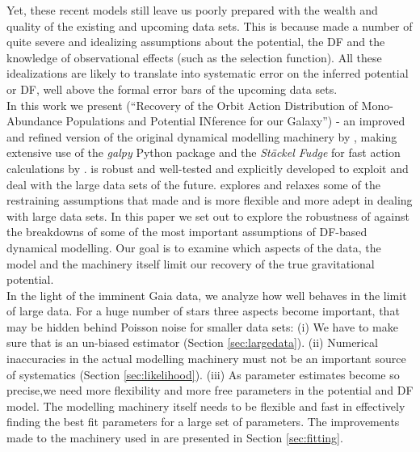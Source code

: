 Yet, these recent models still leave us poorly prepared with the wealth and quality of the existing and upcoming data sets. This is because \citet{bov13} made a number of quite severe and idealizing assumptions about the potential, the DF and the knowledge of observational effects (such as the selection function). All these idealizations are likely to translate into systematic error on the inferred potential or DF, well above the formal error bars of the upcoming data sets. \\

In this work we present \RM{} (``\textsc{R}ecovery of the \textsc{O}rbit \textsc{A}ction \textsc{D}istribution of \textsc{M}ono-\textsc{A}bundance \textsc{P}opulations and \textsc{P}otential \textsc{IN}ference for our \textsc{G}alaxy'') - an improved and refined version of the original dynamical modelling machinery by \citet{bov13}, making extensive use of the \emph{galpy} Python package \citep{bov15} and the \emph{St\"{a}ckel Fudge} for fast action calculations by \cite{2012MNRAS.426.1324B}. \RM{} is robust and well-tested and explicitly developed to exploit and deal with the large data sets of the future. \RM{} explores and relaxes some of the restraining assumptions that \citet{bov13} made and is more flexible and more adept in dealing with large data sets. In this paper we set out to explore the robustness of \RM{} against the breakdowns of some of the most important assumptions of DF-based dynamical modelling. Our goal is to examine which aspects of the data, the model and the machinery itself limit our recovery of the true gravitational potential.\\

In the light of the imminent Gaia data, we analyze how well \RM{} behaves in the limit of large data. For a huge number of stars three aspects become important, that may be hidden behind Poisson noise for smaller data sets: (i) We have to make sure that \RM{} is an un-biased estimator (Section \ref{sec:largedata}). (ii) Numerical inaccuracies in the actual modelling machinery must not be an important source of systematics (Section \ref{sec:likelihood}). (iii) As parameter estimates become so precise,we need more flexibility and more free parameters in the potential and DF model. The modelling machinery itself needs to be flexible and fast in effectively finding the best fit parameters for a large set of parameters. The improvements made to the machinery used in \citet{bov13} are presented in Section \ref{sec:fitting}. \\

